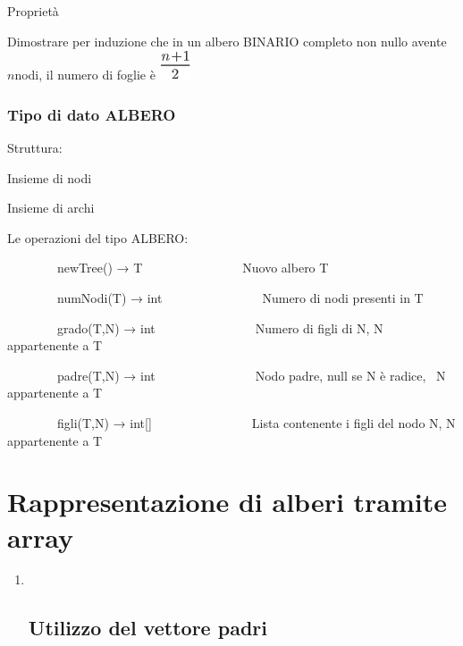 \documentclass{article}
\begin{document}
{}

{}

{Proprietà}

{Dimostrare per induzione che in un albero BINARIO completo non nullo
avente }$n${nodi, il numero di foglie è
}\includegraphics{images/image99.png}

{}

{}

{}

{}

{}

{}

\hypertarget{h.8kg49eb4dpz1}{\subsubsection{\texorpdfstring{{Tipo di
dato ALBERO}}{Tipo di dato ALBERO}}\label{h.8kg49eb4dpz1}}

{}

{Struttura:}

{}

{Insieme di nodi}

{Insieme di archi}

{}

{Le operazioni del tipo ALBERO:}

{}

{~~~~~~~~newTree() → T~~~~~~~~~~~~~~~~Nuovo albero T}

{~~~~~~~~numNodi(T) → int~~~~~~~~~~~~~~~~Numero di nodi presenti in T}

{~~~~~~~~grado(T,N) → int~~~~~~~~~~~~~~~~Numero di figli di N, N
appartenente a T}

{~~~~~~~~padre(T,N) → int~~~~~~~~~~~~~~~~Nodo padre, null se N è radice,
~N appartenente a T}

{~~~~~~~~figli(T,N) → int{[}{]}~~~~~~~~~~~~~~~~Lista contenente i figli
del nodo N, N appartenente a T}

{}

\hypertarget{h.ueuovjwdu9zj}{\section{\texorpdfstring{{Rappresentazione
di alberi tramite
array}}{Rappresentazione di alberi tramite array}}\label{h.ueuovjwdu9zj}}

{}

\begin{enumerate}
\item ~
  \hypertarget{h.nrzs3ooed9o}{\subsection{\texorpdfstring{{Utilizzo del
  vettore padri}}{Utilizzo del vettore padri}}\label{h.nrzs3ooed9o}}
\end{enumerate}
\end{document}
